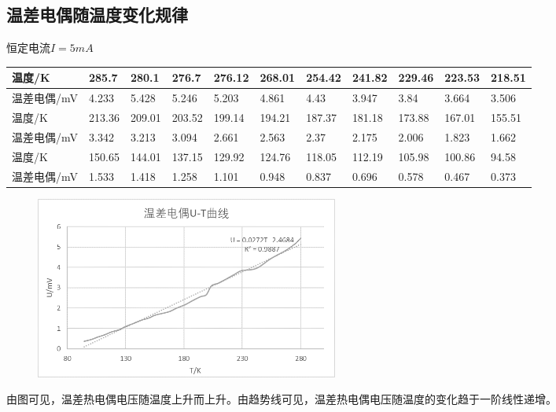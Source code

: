 \documentclass[UTF8]{ctexart}
\begin{document}
\subsection{温差电偶随温度变化规律}
恒定电流$I=5mA$
\begin{table}[H]
\centering
\tiny
\begin{tabular}{|l|l|l|l|l|l|l|l|l|l|l|}
\hline
温度/K    & 285.7  & 280.1  & 276.7  & 276.12 & 268.01 & 254.42 & 241.82 & 229.46 & 223.53 & 218.51      \\\hline
温差电偶/mV & 4.233  & 5.428  & 5.246  & 5.203  & 4.861  & 4.43   & 3.947  & 3.84   & 3.664  & 3.506       \\\hline
温度/K    & 213.36 & 209.01 & 203.52 & 199.14 & 194.21 & 187.37 & 181.18 & 173.88 & 167.01 & 155.51      \\\hline
温差电偶/mV & 3.342  & 3.213  & 3.094  & 2.661  & 2.563  & 2.37   & 2.175  & 2.006  & 1.823  & 1.662       \\\hline
温度/K    & 150.65 & 144.01 & 137.15 & 129.92 & 124.76 & 118.05 & 112.19 & 105.98 & 100.86 & 94.58 \\\hline
温差电偶/mV & 1.533  & 1.418  & 1.258  & 1.101  & 0.948  & 0.837  & 0.696  & 0.578  & 0.467  & 0.373   \\ \hline   
\end{tabular}
\end{table}
\begin{figure}[H]
\centering
\includegraphics[width=10cm]{pic4.png}
\end{figure}
由图可见，温差热电偶电压随温度上升而上升。由趋势线可见，温差热电偶电压随温度的变化趋于一阶线性递增。
\end{document}
